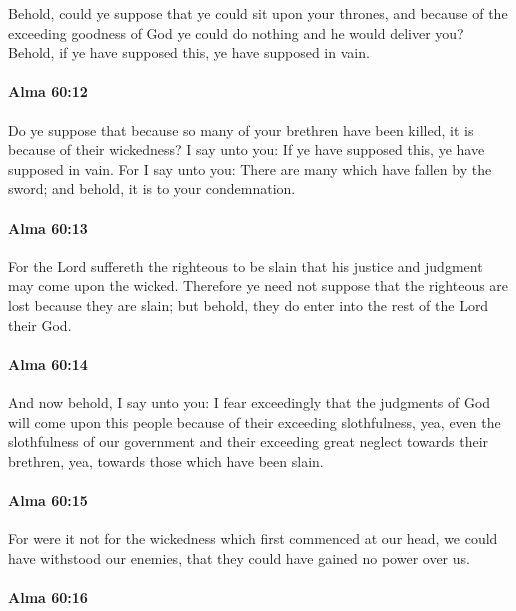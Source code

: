 			Behold, could ye suppose that ye could sit upon your thrones,
			and because of the exceeding goodness of God
			ye could do nothing and he would deliver you?
			Behold, if ye have supposed this, ye have supposed in vain.

		\paragraph{Alma 60:12} %
			\label{ALMA-60-12}

			Do ye suppose that because so many of your brethren have been killed,
			it is because of their wickedness?
			I say unto you:
			If ye have supposed this, ye have supposed in vain.
			For I say unto you:
			There are many which have fallen by the sword;
			and behold, it is to your condemnation.

		\paragraph{Alma 60:13} %
			\label{ALMA-60-13}

			For the Lord suffereth the righteous to be slain
			that his justice and judgment may come upon the wicked.
			Therefore ye need not suppose
			that the righteous are lost because they are slain;
			but behold, they do enter into the rest of the Lord their God.

		\paragraph{Alma 60:14} %
			\label{ALMA-60-14}

			And now behold, I say unto you:
			I fear exceedingly that the judgments of God will come upon this people
			because of their exceeding slothfulness,
			yea, even the slothfulness of our government
			and their exceeding great neglect towards their brethren,
			yea, towards those which have been slain.

		\paragraph{Alma 60:15} %
			\label{ALMA-60-15}

			For were it not for the wickedness which first commenced at our head,
			we could have withstood our enemies,
			that they could have gained no power over us.

		\paragraph{Alma 60:16} %
			\label{ALMA-60-16}

